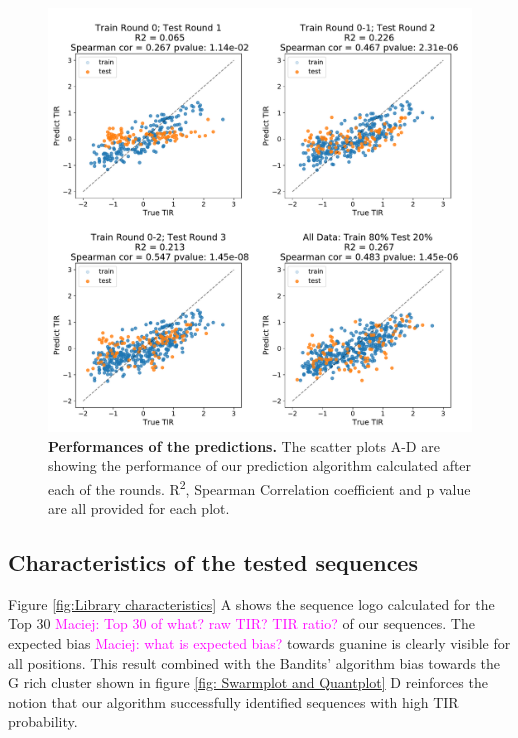 \documentclass{article}
\newcommand{\mengyan}[1]{\textcolor{magenta}{#1}}
\begin{document}
\begin{figure}[!ht]
    \centering
    \includegraphics[scale=0.4]{plots/Main_Paper/scatter_abc1_FF.pdf}
    \caption{\textbf{Performances of the predictions.} The scatter plots A-D are showing the performance of our prediction algorithm calculated after each of the rounds. R\textsuperscript{2}, Spearman Correlation coefficient and p value are all provided for each plot.}
    \label{fig: Scatterplot}
\end{figure}

\subsection{Characteristics of the tested sequences}

Figure \ref{fig:Library characteristics} A shows the sequence logo calculated for the Top 30 \mengyan{Maciej: Top 30 of what? raw TIR? TIR ratio?} of our sequences.
The expected bias \mengyan{Maciej: what is expected bias?} towards guanine is clearly visible for all positions.
This result combined with the Bandits' algorithm bias towards the G rich cluster shown in figure \ref{fig: Swarmplot and Quantplot} D reinforces the notion that our algorithm successfully identified sequences with high TIR probability.
\end{document}
